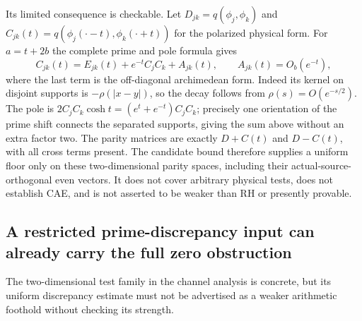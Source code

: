 Its limited consequence is checkable. Let
$D_{jk}=q(\phi_j,\phi_k)$ and
$C_{jk}(t)=q(\phi_j(\cdot-t),\phi_k(\cdot+t))$ for the polarized
physical form. For $a=t+2b$ the complete prime and pole formula gives
\[
 C_{jk}(t)=E_{jk}(t)+e^{-t}C_jC_k+A_{jk}(t),
 \qquad A_{jk}(t)=O_b(e^{-t}),
\]
where the last term is the off-diagonal archimedean form. Indeed its
kernel on disjoint supports is $-\rho(|x-y|)$, so the decay follows
from $\rho(s)=O(e^{-s/2})$. The pole is
$2C_jC_k\cosh t=(e^t+e^{-t})C_jC_k$; precisely one orientation of
the prime shift connects the separated supports, giving the sum above
without an extra factor two. The parity matrices are exactly
$D+C(t)$ and $D-C(t)$, with all cross terms present. The candidate
bound therefore supplies a uniform floor only on these two-dimensional
parity spaces, including their actual-source-orthogonal even vectors.
It does not cover arbitrary physical tests, does not establish CAE,
and is not asserted to be weaker than RH or presently provable.


\subsection*{A restricted prime-discrepancy input can already carry the full zero obstruction}
\label{sec:ns43-bump-strength}
The two-dimensional test family in the channel analysis is concrete,
but its uniform discrepancy estimate must not be advertised as a
weaker arithmetic foothold without checking its strength.

